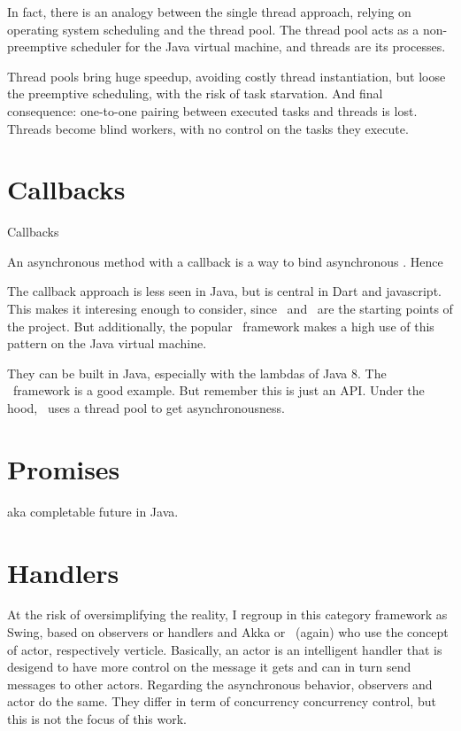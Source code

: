 In fact, there is an analogy between the single thread approach, relying on operating system scheduling and the thread pool. The thread pool acts as a non-preemptive scheduler for the Java virtual machine, and threads are its processes.

Thread pools bring huge speedup, avoiding costly thread instantiation, but loose the preemptive scheduling, with the risk of task starvation.
And final consequence: one-to-one pairing between executed tasks and threads is lost. Threads become blind workers, with no control on the tasks they execute.

\section{Callbacks}

Callbacks 

An asynchronous method with a callback is a way to bind asynchronous . Hence 

The callback approach is less seen in Java, but is central in Dart and javascript. This makes it interesing enough to consider, since \zonejs\ and \zonedrt\ are the starting points of the project. But additionally, the popular \vertx\ framework makes a high use of this pattern on the Java virtual machine. 

They can be built in Java, especially with the lambdas of Java 8. The \vertx\ framework is a good example. But remember this is just an API. Under the hood, \vertx\ uses a thread pool to get asynchronousness.

\section{Promises}
aka completable future in Java.

\section{Handlers}
At the risk of oversimplifying the reality, I regroup in this category framework as Swing, based on observers or handlers
and Akka or \vertx\ (again) who use the concept of actor, respectively verticle. Basically, an actor is an intelligent handler that is desigend to have more control on the message it gets and can in turn send messages to other actors. Regarding the asynchronous behavior, observers and actor do the same. They differ in term of concurrency concurrency control, but this is not the focus of this work.


